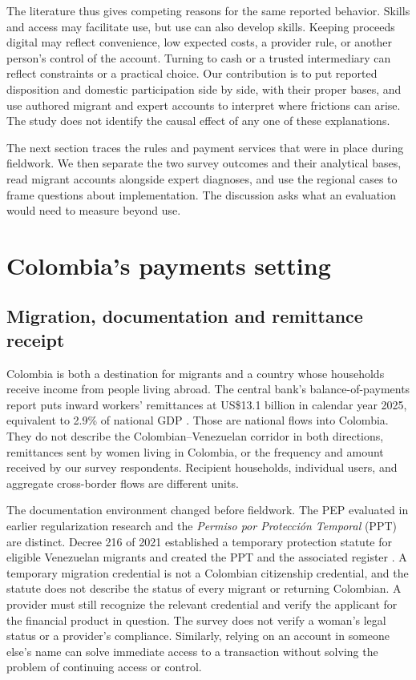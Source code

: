 \documentclass[12pt]{article}
\begin{document}
The literature thus gives competing reasons for the same reported behavior. Skills and access may facilitate use, but use can also develop skills. Keeping proceeds digital may reflect convenience, low expected costs, a provider rule, or another person's control of the account. Turning to cash or a trusted intermediary can reflect constraints or a practical choice. Our contribution is to put reported disposition and domestic participation side by side, with their proper bases, and use authored migrant and expert accounts to interpret where frictions can arise. The study does not identify the causal effect of any one of these explanations.


The next section traces the rules and payment services that were in place during fieldwork. We then separate the two survey outcomes and their analytical bases, read migrant accounts alongside expert diagnoses, and use the regional cases to frame questions about implementation. The discussion asks what an evaluation would need to measure beyond use.

\section{Colombia's payments setting}

\subsection{Migration, documentation and remittance receipt}
Colombia is both a destination for migrants and a country whose households receive income from people living abroad. The central bank's balance-of-payments report puts inward workers' remittances at US\$13.1 billion in calendar year 2025, equivalent to 2.9\% of national GDP \citep{banrepbop2026}. Those are national flows into Colombia. They do not describe the Colombian--Venezuelan corridor in both directions, remittances sent by women living in Colombia, or the frequency and amount received by our survey respondents. Recipient households, individual users, and aggregate cross-border flows are different units.

The documentation environment changed before fieldwork. The PEP evaluated in earlier regularization research and the \emph{Permiso por Protección Temporal} (PPT) are distinct. Decree 216 of 2021 established a temporary protection statute for eligible Venezuelan migrants and created the PPT and the associated register \citep{decree216}. A temporary migration credential is not a Colombian citizenship credential, and the statute does not describe the status of every migrant or returning Colombian. A provider must still recognize the relevant credential and verify the applicant for the financial product in question. The survey does not verify a woman's legal status or a provider's compliance. Similarly, relying on an account in someone else's name can solve immediate access to a transaction without solving the problem of continuing access or control.
\end{document}
